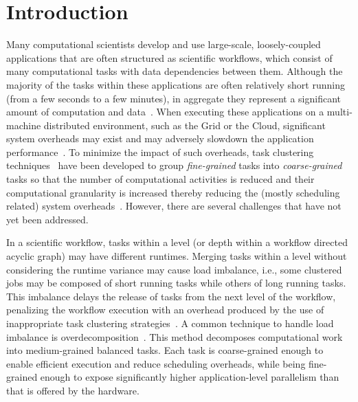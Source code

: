 
\section{Introduction}
\label{intro}
Many computational scientists develop and use large-scale, loosely-coupled applications that are often structured as scientific workflows, which consist of many computational tasks with data dependencies between them. Although the majority of the tasks within these applications are often relatively short running (from a few seconds to a few minutes), in aggregate they represent a significant amount of computation and data~\cite{LIGO}. When executing these applications on a multi-machine distributed environment, such as the Grid or the Cloud, significant system overheads may exist and may adversely slowdown the application performance~\cite{Chen}. To minimize the impact of such overheads, task clustering techniques~\cite{Muthuvelu:2005:DJG:1082290.1082297,4493929,Muthuvelu2010,Muthuvelu2013170,keat-2006,ang-2009,4958835,Singh:2008:WTC:1341811.1341822,europar-granularity} have been developed to group \emph{fine-grained} tasks into \emph{coarse-grained} tasks so that the number of computational activities is reduced and their computational granularity is increased thereby reducing the (mostly scheduling related) system overheads~\cite{Chen}.
However, there are several challenges that have not yet been addressed.

In a scientific workflow, tasks within a level (or depth within a workflow directed acyclic graph) may have different runtimes. Merging tasks within a level without considering the runtime variance may cause load imbalance, i.e., some clustered jobs may be composed of short running tasks while others of long running tasks. This imbalance delays the release of tasks from the next level of the workflow, penalizing the workflow execution with an overhead produced by the use of inappropriate task clustering strategies~\cite{Chen2013}.
A common technique to handle load imbalance is overdecomposition~\cite{Lifflander}.
This method decomposes computational work into medium-grained balanced tasks. Each task is coarse-grained enough to enable efficient execution and reduce scheduling overheads, while being fine-grained enough to expose significantly higher application-level parallelism than that is offered by the hardware. 

